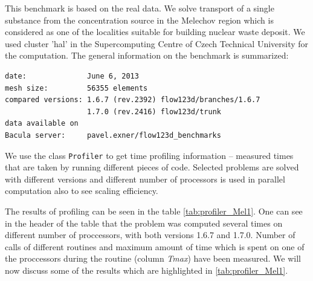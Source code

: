 This benchmark is based on the real data. We solve transport of a single 
substance from the concentration source in the Melechov region which is considered as
one of the localities suitable for building nuclear waste deposit.
We used cluster 'hal' in the Supercomputing Centre of Czech Technical University for the computation.
The general information on the benchmark is summarized:

\begin{verbatim}
date:              June 6, 2013 
mesh size:         56355 elements
compared versions: 1.6.7 (rev.2392) flow123d/branches/1.6.7 
                   1.7.0 (rev.2416) flow123d/trunk 
data available on 
Bacula server:     pavel.exner/flow123d_benchmarks
\end{verbatim}

We use the class \verb'Profiler' to get time profiling information -- measured times that are taken by running different 
pieces of code. Selected problems are solved with different versions and different number 
of processors is used in parallel computation also to see scaling efficiency.


The results of profiling can be seen in the table \ref{tab:profiler_Mel1}. One can see in the header 
of the table that the problem was computed several times on different number of proccessors, with both 
versions 1.6.7 and 1.7.0. Number of calls of different routines and maximum amount of time which is 
spent on one of the proccessors during the routine (column \emph{Tmax}) have been measured.
We will now discuss some of the results which are highlighted in \ref{tab:profiler_Mel1}.


